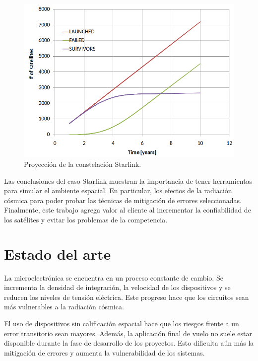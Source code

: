 \newpage

\begin{figure}[htbp]
	\centering
    \includegraphics[width=\textwidth]{./Figures/starlinkpopulation.png}
    \caption{Proyección de la constelación Starlink\protect\footnotemark.}
    \label{fig:starlinkdeath}
\end{figure}

Las conclusiones del caso Starlink muestran la importancia de tener herramientas para simular el ambiente espacial.
En particular, los efectos de la radiación cósmica para poder probar las técnicas de mitigación de errores seleccionadas.
Finalmente, este trabajo agrega valor al cliente al incrementar la confiabilidad de los satélites y evitar los problemas de la competencia.

\section{Estado del arte}
\label{sec:arte}

La microelectrónica se encuentra en un proceso constante de cambio.
Se incrementa la densidad de integración, la velocidad de los dispositivos y se reducen los niveles de tensión eléctrica.
Este progreso hace que los circuitos sean más vulnerables a la radiación cósmica.

El uso de dispositivos sin calificación espacial hace que los riesgos frente a un error transitorio sean mayores.
Además, la aplicación final de vuelo no suele estar disponible durante la fase de desarrollo de los proyectos.
Esto dificulta aún más la mitigación de errores y aumenta la vulnerabilidad de los sistemas.

